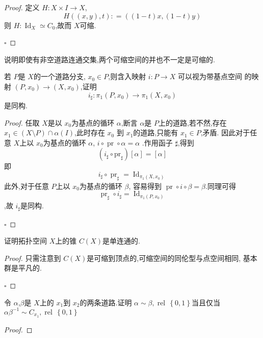 \documentclass[../../几何与拓扑.tex]{subfiles}
\begin{document}
\begin{problemset}
    
    \begin{proof}
    
        定义 \(  H: X \times I\to X  \), \[
        H\left( \left( x,y \right),t  \right): =  \left( \left( 1-t \right) x, \left( 1-t \right)y  \right)  
        \] 则 \(  H: \operatorname{Id}_{X}\simeq  C_{0} \),故而  \(  X  \)可缩.    
    
        \hfill $\square$
    \end{proof}


    \item 说明即使有非空道路连通交集,两个可缩空间的并也不一定是可缩的.
    \item 若 \(  P  \)是 \(  X  \)的一个道路分支, \(  x_0 \in P  \),则含入映射 \(  i: P\to X  \)    可以视为带基点空间 的映射
     \(  \left( P,x_0 \right)\to \left( X,x_0 \right)    \),证明 \[
     i_{\sharp }: \pi _1 \left( P,x_0 \right)\to \pi _1 \left( X,x_0 \right)  
     \]是同构. 

     \begin{proof}
     
        任取  \(  X  \)是以 \(  x_0  \)为基点的循环 \(  \alpha   \),断言 \(  \alpha   \)是 \(  P  \)上的道路,若不然,存在 \(  x_1 \in \left( X\setminus P   \right)\cap \alpha \left( I \right)  \),此时存在 \(  x_0  \)  到 \(  x_1  \)的道路,只能有 \(  x_1 \in P  \),矛盾.
        因此对于任意  \(  X  \)上以 \(  x_0  \)为基点的循环 \(  \alpha   \), \(i\circ   \operatorname{pr}\circ \alpha  =  \alpha   \)      .作用函子 \(  \sharp   \),得到 \[
       \left(  i_{\sharp }\circ \mathrm{pr}_{\sharp }  \right)[\alpha ] =  [\alpha ] 
        \] 即 \[
        i_{\sharp }\circ \operatorname{pr}_{\sharp } =  \operatorname{Id}_{\pi _1 \left( X,x_0 \right) }
        \]此外,对于任意 \(  P  \)上以 \(  x_0  \)为基点的循环 \(  \beta   \),   容易得到 \(  \operatorname{pr}\circ i \circ \beta = \beta   \).同理可得 \[
        \operatorname{pr}_{\sharp }\circ i_{\sharp } =  \operatorname{Id}_{\pi _1 \left( P,x_0 \right) }
        \] ,故 \(  i_{\sharp }  \)是同构. 
     
        \hfill $\square$
     \end{proof}

     \item 证明拓扑空间 \(  X  \)上的锥 \(  C\left( X \right)   \)是单连通的.
     \begin{proof}
        只需注意到 \(  C\left( X \right)   \)是可缩到顶点的,可缩空间的同伦型与点空间相同, 基本群是平凡的.
            
     
        \hfill $\square$
     \end{proof}
     \item 令 \(  \alpha   \),\(  \beta   \)是 \(  X  \)上的  \(  x_1  \)到 \(  x_2  \)的两条道路.证明 \(  \alpha \sim \beta  ,\operatorname{rel}\,\left\{ 0,1 \right\}  \)当且仅当 \(  \alpha \beta ^{-1} \sim C_{x_1},\operatorname{rel}\,\left\{ 0,1 \right\}  \)       
     \begin{proof}
        

\end{proof}
\end{problemset}
\end{document}
